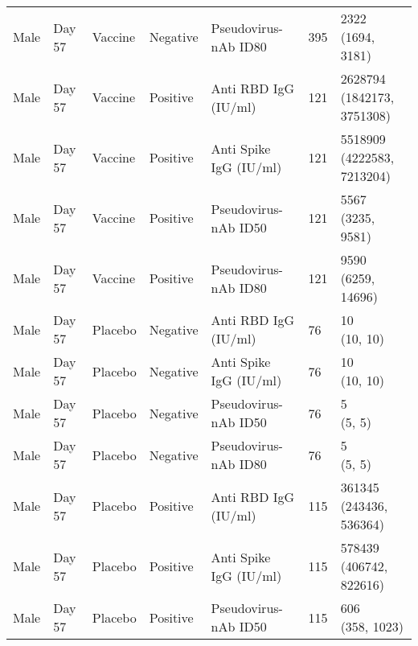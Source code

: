 \documentclass[]{book}
\theoremstyle{definition}
\theoremstyle{definition}
\theoremstyle{definition}
\newcommand{\1}{\mathbbm{1}}
\begin{document}
\begin{landscape}
\begin{ThreePartTable}
\begin{longtable}[t]{>{\raggedright\arraybackslash}p{7cm}llllll}
\hspace{1em}Male & Day 57 & Vaccine & Negative & Pseudovirus-nAb ID80 & 395 & \makecell[l]{2322\\(1694, 3181)}\\
\hspace{1em}Male & Day 57 & Vaccine & Positive & Anti RBD IgG (IU/ml) & 121 & \makecell[l]{2628794\\(1842173, 3751308)}\\
\hspace{1em}Male & Day 57 & Vaccine & Positive & Anti Spike IgG (IU/ml) & 121 & \makecell[l]{5518909\\(4222583, 7213204)}\\
\hspace{1em}Male & Day 57 & Vaccine & Positive & Pseudovirus-nAb ID50 & 121 & \makecell[l]{5567\\(3235, 9581)}\\
\hspace{1em}Male & Day 57 & Vaccine & Positive & Pseudovirus-nAb ID80 & 121 & \makecell[l]{9590\\(6259, 14696)}\\
\hspace{1em}Male & Day 57 & Placebo & Negative & Anti RBD IgG (IU/ml) & 76 & \makecell[l]{10\\(10, 10)}\\
\hspace{1em}Male & Day 57 & Placebo & Negative & Anti Spike IgG (IU/ml) & 76 & \makecell[l]{10\\(10, 10)}\\
\hspace{1em}Male & Day 57 & Placebo & Negative & Pseudovirus-nAb ID50 & 76 & \makecell[l]{5\\(5, 5)}\\
\hspace{1em}Male & Day 57 & Placebo & Negative & Pseudovirus-nAb ID80 & 76 & \makecell[l]{5\\(5, 5)}\\
\hspace{1em}Male & Day 57 & Placebo & Positive & Anti RBD IgG (IU/ml) & 115 & \makecell[l]{361345\\(243436, 536364)}\\
\hspace{1em}Male & Day 57 & Placebo & Positive & Anti Spike IgG (IU/ml) & 115 & \makecell[l]{578439\\(406742, 822616)}\\
\hspace{1em}Male & Day 57 & Placebo & Positive & Pseudovirus-nAb ID50 & 115 & \makecell[l]{606\\(358, 1023)}\\

\end{longtable}
\end{ThreePartTable}
\end{landscape}
\end{document}

